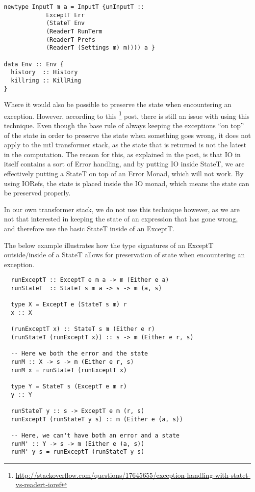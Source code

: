 \documentclass[11pt,a4paper]{article}
\begin{document}
\begin{verbatim}
newtype InputT m a = InputT {unInputT ::
            ExceptT Err
            (StateT Env
            (ReaderT RunTerm
            (ReaderT Prefs
            (ReaderT (Settings m) m)))) a }

data Env :: Env {
  history  :: History
  killring :: KillRing
}
\end{verbatim}

Where it would also be possible to preserve the state when encountering an
exception. However, according to this
\footnote{\url{http://stackoverflow.com/questions/17645655/exception-handling-with-statet-vs-readert-ioref}}
post, there is still an issue with using this technique. Even though the base
rule of always keeping the exceptions ``on top'' of the state in order to
preserve the state when something goes wrong, it does not apply to the mtl
transformer stack, as the state that is returned is not the latest in the
computation. The reason for this, as explained in the post, is that IO in
itself contains a sort of Error handling, and by putting IO inside StateT, we
are effectively putting a StateT on top of an Error Monad, which will not work.
By using IORefs, the state is placed inside the IO monad, which means the state
can be preserved properly.

In our own transformer stack, we do not use this technique however, as we are
not that interested in keeping the state of an expression that has gone wrong,
and therefore use the basic StateT inside of an ExceptT.

The below example illustrates how the type signatures of an ExceptT
outside/inside of a StateT allows for preservation of state when encountering
an exception.

\begin{verbatim}
  runExceptT :: ExceptT e m a -> m (Either e a)
  runStateT  :: StateT s m a -> s -> m (a, s)

  type X = ExceptT e (StateT s m) r
  x :: X

  (runExceptT x) :: StateT s m (Either e r)
  (runStateT (runExceptT x)) :: s -> m (Either e r, s)

  -- Here we both the error and the state
  runM :: X -> s -> m (Either e r, s)
  runM x = runStateT (runExceptT x)

  type Y = StateT s (ExceptT e m r)
  y :: Y

  runStateT y :: s -> ExceptT e m (r, s)
  runExceptT (runStateT y s) :: m (Either e (a, s))

  -- Here, we can't have both an error and a state
  runM' :: Y -> s -> m (Either e (a, s))
  runM' y s = runExceptT (runStateT y s)
\end{verbatim}
\end{document}
